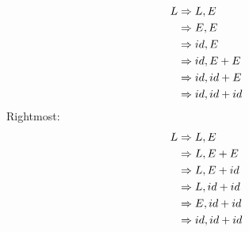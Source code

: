 \documentclass[12pt]{article}
\begin{document}
\begin{enumerate}[label=\arabic*.]
    
\begin{align}
L &\Rightarrow L, E \notag\\
  &\Rightarrow E, E \notag\\
  &\Rightarrow id, E \notag\\
  &\Rightarrow id, E + E \notag\\
  &\Rightarrow id, id + E \notag\\
  &\Rightarrow id, id + id
\end{align}
Rightmost:
\begin{align}
L &\Rightarrow L, E \notag\\
  &\Rightarrow L, E + E \notag\\
  &\Rightarrow L, E + id \notag\\
  &\Rightarrow L, id + id \notag\\
  &\Rightarrow E, id + id \notag\\
  &\Rightarrow id, id + id
\end{align}

    
    
\end{enumerate}
\end{document}
